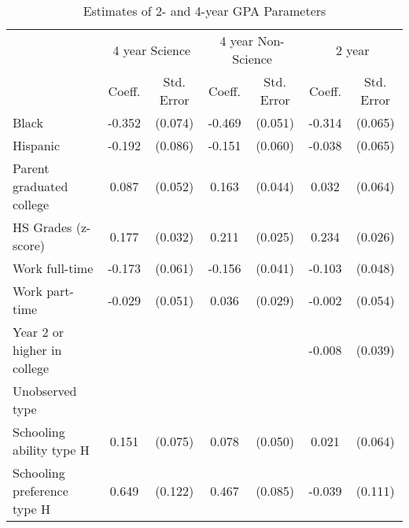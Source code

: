 \begin{table}[ht]
\caption{Estimates of 2- and 4-year GPA Parameters}
\label{tab:GPAEstimates}
\centering
\begin{threeparttable}
\begin{tabular}{lcccccc}
\toprule
 & \multicolumn{2}{c}{4 year Science} & \multicolumn{2}{c}{4 year Non-Science} & \multicolumn{2}{c}{2 year}\\
\cmidrule(r){2-3}\cmidrule(lr){4-5}\cmidrule(l){6-7}
 & Coeff.  & Std. Error  & Coeff.  & Std. Error  & Coeff.  & Std. Error\\
\midrule
Black & -0.352 & (0.074) & -0.469 & (0.051) & -0.314 & (0.065) \\ 
Hispanic & -0.192 & (0.086) & -0.151 & (0.060) & -0.038 & (0.065) \\ 
Parent graduated college & 0.087 & (0.052) & 0.163 & (0.044) & 0.032 & (0.064) \\ 
HS Grades (z-score) & 0.177 & (0.032) & 0.211 & (0.025) & 0.234 & (0.026) \\ 
Work full-time & -0.173 & (0.061) & -0.156 & (0.041) & -0.103 & (0.048) \\ 
Work part-time & -0.029 & (0.051) & 0.036 & (0.029) & -0.002 & (0.054) \\ 
Year 2 or higher in college &  &  &  &  & -0.008 & (0.039) \\ 
\midrule
Unobserved type \\ 
Schooling ability type H & 0.151 & (0.075) & 0.078 & (0.050) & 0.021 & (0.064) \\ 
Schooling preference type H & 0.649 & (0.122) & 0.467 & (0.085) & -0.039 & (0.111) \\ 

\end{tabular}
\end{threeparttable}
\end{table}
